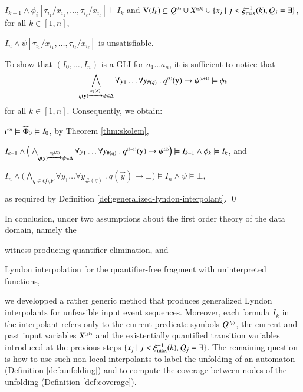{\begin{compactitem}
    \item $I_{k-1} \wedge \phi_i[\tau_{i_1}/x_{i_1}, \ldots,
      \tau_{i_\ell}/x_{i_\ell}] \models I_k$ and $\mathrm{V}({I_k}) \subseteq
      {Q}^{\scriptscriptstyle{({k})}} \cup {X}^{\scriptscriptstyle{({\leq k})}} \cup \{ x_j \mid j <
       \xi_{\max}^{-1}(k), Q_j = \exists \}$, for all $k \in [1,n]$,
    \item $I_n \wedge \psi[\tau_{i_1}/x_{i_1}, \ldots,
      \tau_{i_\ell}/x_{i_\ell}]$ is unsatisfiable.
  \end{compactitem}
  To show that $(I_0,\ldots,I_n)$ is a GLI for $a_1\ldots a_n$, it is
  sufficient to notice that \[\bigwedge_{q(\mathbf y) \xrightarrow{{\scriptscriptstyle a_k(X)}}_{{\scriptstyle }}
    \psi \in \Delta} \forall y_1 \ldots \forall y_{\#(q)} ~.~
  {q}^{\scriptscriptstyle{({k})}}(\mathbf y) \rightarrow {\psi}^{\scriptscriptstyle{({k+1})}} \models \phi_k\]
  for all $k \in [1,n]$. Consequently, we obtain: \begin{compactitem}
    \item ${\iota}^{\scriptscriptstyle{({0})}} \models \widehat{\Phi}_0 \models I_0$, by
      Theorem \ref{thm:skolem},
    \item $I_{k-1} \wedge \Big(\bigwedge_{q(\mathbf y) \xrightarrow{{\scriptscriptstyle a_k(X)}}_{{\scriptstyle }}
      \psi \in \Delta} \forall y_1 \ldots \forall y_{\#(q)} ~.~
      {q}^{\scriptscriptstyle{({k-1})}}(\mathbf y) \rightarrow {\psi}^{\scriptscriptstyle{({k})}}\Big) \models
      I_{k-1} \wedge \phi_k \models I_k$, and 
    \item $I_n \wedge \Big(\bigwedge_{q \in Q \setminus F} \forall y_1
      \ldots \forall y_{\#(q)} ~.~ q(\vec{y}) \rightarrow \bot\Big)
      \models I_n \wedge \psi \models \bot$,     
  \end{compactitem}
  as required by Definition
  \ref{def:generalized-lyndon-interpolant}. \qed}

In conclusion, under two assumptions about the first order theory of
the data domain, namely the \begin{inparaenum}[(i)]
\item witness-producing quantifier elimination, and
\item Lyndon interpolation for the quantifier-free fragment with
  uninterpreted functions,
\end{inparaenum}
we developped a rather generic method that produces generalized Lyndon
interpolants for unfeasible input event sequences. Moreover, each
formula $I_k$ in the interpolant refers only to the current predicate
symbols ${Q}^{\scriptscriptstyle{({I_k})}}$, the current and past input variables
${X}^{\scriptscriptstyle{({\leq k})}}$ and the existentially quantified transition
variables introduced at the previous steps $\{ x_j \mid j <
  \xi_{\max}^{-1}(k), Q_j = \exists \}$. The remaining question is how
to use such non-local interpolants to label the unfolding of an
automaton (Definition \ref{def:unfolding}) and to compute the coverage
between nodes of the unfolding (Definition \ref{def:coverage}).

